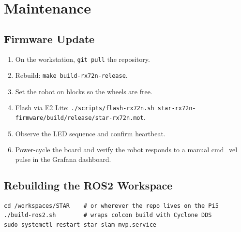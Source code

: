 \documentclass[11pt,letterpaper]{article}
\begin{document}
\section{Maintenance}
\label{sec:maint}

\subsection{Firmware Update}
\begin{enumerate}[leftmargin=1.4em,itemsep=2pt]
\item On the workstation, \texttt{git pull} the repository.
\item Rebuild:
      \texttt{make build-rx72n-release}.
\item Set the robot on blocks so the wheels are free.
\item Flash via E2 Lite:
      \texttt{./scripts/flash-rx72n.sh
      star-rx72n-firmware/build/release/star-rx72n.mot}.
\item Observe the LED sequence and confirm heartbeat.
\item Power-cycle the board and verify the robot responds to a
      manual cmd\_vel pulse in the Grafana dashboard.
\end{enumerate}

\subsection{Rebuilding the ROS2 Workspace}
\begin{lstlisting}[style=shellcmd]
cd /workspaces/STAR    # or wherever the repo lives on the Pi5
./build-ros2.sh        # wraps colcon build with Cyclone DDS
sudo systemctl restart star-slam-mvp.service
\end{lstlisting}
\end{document}
